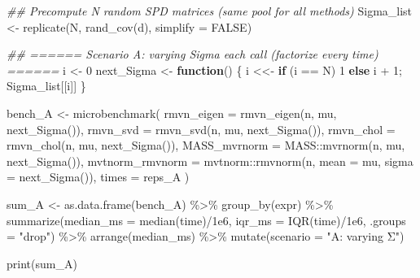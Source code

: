\documentclass[
  letterpaper,
  DIV=11,
  numbers=noendperiod]{scrreprt}
\newenvironment{Shaded}{\begin{snugshade}}{\end{snugshade}}
\newcommand{\AttributeTok}[1]{\textcolor[rgb]{0.40,0.45,0.13}{#1}}
\newcommand{\ConstantTok}[1]{\textcolor[rgb]{0.56,0.35,0.01}{#1}}
\newcommand{\ControlFlowTok}[1]{\textcolor[rgb]{0.00,0.23,0.31}{\textbf{#1}}}
\newcommand{\DecValTok}[1]{\textcolor[rgb]{0.68,0.00,0.00}{#1}}
\newcommand{\DocumentationTok}[1]{\textcolor[rgb]{0.37,0.37,0.37}{\textit{#1}}}
\newcommand{\FloatTok}[1]{\textcolor[rgb]{0.68,0.00,0.00}{#1}}
\newcommand{\FunctionTok}[1]{\textcolor[rgb]{0.28,0.35,0.67}{#1}}
\newcommand{\NormalTok}[1]{\textcolor[rgb]{0.00,0.23,0.31}{#1}}
\newcommand{\OtherTok}[1]{\textcolor[rgb]{0.00,0.23,0.31}{#1}}
\newcommand{\SpecialCharTok}[1]{\textcolor[rgb]{0.37,0.37,0.37}{#1}}
\newcommand{\StringTok}[1]{\textcolor[rgb]{0.13,0.47,0.30}{#1}}
\begin{document}
\begin{tcolorbox}
\begin{Shaded}
\begin{Highlighting}[]
\DocumentationTok{\#\# Precompute N random SPD matrices (same pool for all methods)}
\NormalTok{Sigma\_list }\OtherTok{\textless{}{-}} \FunctionTok{replicate}\NormalTok{(N, }\FunctionTok{rand\_cov}\NormalTok{(d), }\AttributeTok{simplify =} \ConstantTok{FALSE}\NormalTok{)}

\DocumentationTok{\#\# ====== Scenario A: varying Sigma each call (factorize every time) ======}
\NormalTok{i }\OtherTok{\textless{}{-}} \DecValTok{0}
\NormalTok{next\_Sigma }\OtherTok{\textless{}{-}} \ControlFlowTok{function}\NormalTok{() \{ i }\OtherTok{\textless{}\textless{}{-}} \ControlFlowTok{if}\NormalTok{ (i }\SpecialCharTok{==}\NormalTok{ N) }\DecValTok{1} \ControlFlowTok{else}\NormalTok{ i }\SpecialCharTok{+} \DecValTok{1}\NormalTok{; Sigma\_list[[i]] \}}

\NormalTok{bench\_A }\OtherTok{\textless{}{-}} \FunctionTok{microbenchmark}\NormalTok{(}
  \AttributeTok{rmvn\_eigen       =} \FunctionTok{rmvn\_eigen}\NormalTok{(n, mu, }\FunctionTok{next\_Sigma}\NormalTok{()),}
  \AttributeTok{rmvn\_svd         =} \FunctionTok{rmvn\_svd}\NormalTok{(n,   mu, }\FunctionTok{next\_Sigma}\NormalTok{()),}
  \AttributeTok{rmvn\_chol        =} \FunctionTok{rmvn\_chol}\NormalTok{(n,  mu, }\FunctionTok{next\_Sigma}\NormalTok{()),}
  \AttributeTok{MASS\_mvrnorm     =}\NormalTok{ MASS}\SpecialCharTok{::}\FunctionTok{mvrnorm}\NormalTok{(n, mu, }\FunctionTok{next\_Sigma}\NormalTok{()),}
  \AttributeTok{mvtnorm\_rmvnorm  =}\NormalTok{ mvtnorm}\SpecialCharTok{::}\FunctionTok{rmvnorm}\NormalTok{(n, }\AttributeTok{mean =}\NormalTok{ mu, }\AttributeTok{sigma =} \FunctionTok{next\_Sigma}\NormalTok{()),}
  \AttributeTok{times =}\NormalTok{ reps\_A}
\NormalTok{)}

\NormalTok{sum\_A }\OtherTok{\textless{}{-}} \FunctionTok{as.data.frame}\NormalTok{(bench\_A) }\SpecialCharTok{\%\textgreater{}\%}
  \FunctionTok{group\_by}\NormalTok{(expr) }\SpecialCharTok{\%\textgreater{}\%}
  \FunctionTok{summarize}\NormalTok{(}\AttributeTok{median\_ms =} \FunctionTok{median}\NormalTok{(time)}\SpecialCharTok{/}\FloatTok{1e6}\NormalTok{,}
            \AttributeTok{iqr\_ms    =} \FunctionTok{IQR}\NormalTok{(time)}\SpecialCharTok{/}\FloatTok{1e6}\NormalTok{,}
            \AttributeTok{.groups =} \StringTok{"drop"}\NormalTok{) }\SpecialCharTok{\%\textgreater{}\%}
  \FunctionTok{arrange}\NormalTok{(median\_ms) }\SpecialCharTok{\%\textgreater{}\%}
  \FunctionTok{mutate}\NormalTok{(}\AttributeTok{scenario =} \StringTok{"A: varying Σ"}\NormalTok{)}

\FunctionTok{print}\NormalTok{(sum\_A)}
\end{Highlighting}
\end{Shaded}


\end{tcolorbox}
\end{document}
